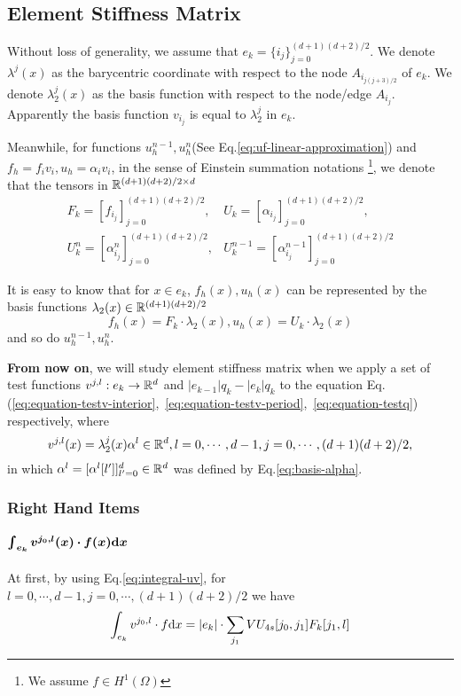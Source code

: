 \subsection{Element Stiffness Matrix}
Without loss of generality, we assume that $e_k=\{i_j\}_{j=0}^{(d+1)(d+2)/2}$.
We denote $\lambda^j(x)$ as the barycentric coordinate with respect to 
the node $A_{i_{j(j+3)/2}}$ of $e_k$. 
We denote $\lambda^j_2(x)$ as the basis function with respect to 
the node/edge $A_{i_j}$.
Apparently the basis function $v_{i_j}$ is equal to $\lambda^j_2$ in $e_k$.

Meanwhile, for functions $u_h^{n-1},u_h^n$(See Eq.\eqref{eq:uf-linear-approximation}) 
and $f_h=f_iv_i,u_h=\alpha_iv_i$, 
in the sense of Einstein summation notations
\footnote{We assume $f\in H^1(\Omega)$}, 
we denote that the tensors in $\mathbb{R}^{(d+1)(d+2)/2\times d}$
\[
  \begin{split}
    F_k=[f_{i_j}]_{j=0}^{(d+1)(d+2)/2},& U_k=[\alpha_{i_j}]_{j=0}^{(d+1)(d+2)/2},\\
    U_{k}^{n}=[\alpha_{i_j}^{n}]_{j=0}^{(d+1)(d+2)/2}, &
    U_{k}^{n-1}=[\alpha_{i_j}^{n-1}]_{j=0}^{(d+1)(d+2)/2} 
  \end{split}
\]

It is easy to know that for $x\in e_k$, $f_h(x),u_h(x)$ can be represented by 
the basis functions $\lambda_2(x)\in\mathbb{R}^{(d+1)(d+2)/2}$
\[f_h(x)=F_k\cdot\lambda_2(x),u_h(x)=U_k\cdot\lambda_2(x)\]
and so do $u_h^{n-1},u_h^n$. 

\textbf{From now on}, we will study element stiffness matrix when we apply 
a set of test functions $v^{j,l}:e_k\to\mathbb{R}^{d}$ and 
$|e_{k-1}|q_k-|e_k|q_k$ to the equation 
Eq.(\ref{eq:equation-testv-interior},~\ref{eq:equation-testv-period},~\ref{eq:equation-testq}) respectively, where
\[v^{j,l}(x)=\lambda_2^j(x)\alpha^l\in\mathbb{R}^{d},l=0,\cdots,d-1,j=0,\cdots,(d+1)(d+2)/2,\]
in which $\alpha^l=[\alpha^l[l']]_{l'=0}^d\in\mathbb{R}^{d}$ 
was defined by Eq.\eqref{eq:basis-alpha}.

\subsubsection{Right Hand Items}
\paragraph{$\bm{\int_{e_k}v^{j_0,l}(x)\cdot f(x)\mathrm{d} x}$}
At first, by using Eq.\eqref{eq:integral-uv}, for 
$l=0,\cdots,d-1,j=0,\cdots,(d+1)(d+2)/2$ we have
\begin{equation}
  \int_{e_k}v^{j_0,l}\cdot f\mathrm{d} x = |e_k|\cdot \sum_{j_1}VU_{4s}[j_0,j_1]F_k[j_1,l]
\end{equation}


